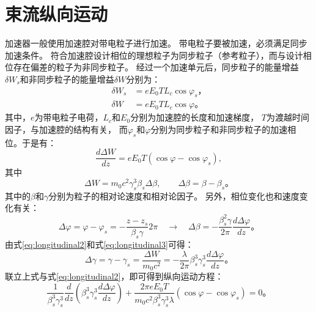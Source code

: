 \section{束流纵向运动}
加速器一般使用加速腔对带电粒子进行加速\cite{wang1986protronLinac,yao1986elecLinac,wangler1998principles}。
带电粒子要被加速，必须满足同步加速条件。
符合加速腔设计相位的理想粒子为同步粒子（参考粒子），而与设计相位存在偏差的粒子为非同步粒子。
经过一个加速单元后，同步粒子的能量增益$\delta W_s$和非同步粒子的能量增益$\delta W$分别为：
\begin{equation}
    \label{eq:longitudinal1}
    \begin{aligned}
        \delta W_s &= e E_0 T L_c \cos {\varphi}_s \text{，} \\
        \delta W   &= e E_0 T L_c \cos {\varphi}   \text{。}
    \end{aligned}
\end{equation}
其中，$e$为带电粒子电荷，$L_c$和$E_0$分别为加速腔的长度和加速梯度，
$T$为渡越时间因子，与加速腔的结构有关，
而${\varphi}_s$和${\varphi}$分别为同步粒子和非同步粒子的加速相位。于是有：
\begin{equation}
    \label{eq:longitudinal2}
        \frac{d\Delta W}{dz} = e E_0 T (\cos {\varphi} - \cos {\varphi}_s),
\end{equation}
其中
\begin{equation}
    \label{eq:longitudinal2_cont}
        \Delta W = m_0 c^2 {\gamma}_s^3 {\beta}_s \Delta \beta, \qquad \Delta \beta = \beta - {\beta}_s \text{。}
\end{equation}
其中的$\beta$和$\gamma$分别为粒子的相对论速度和相对论因子。
另外，相位变化也和速度变化有关：
\begin{equation}
    \label{eq:longitudinal3}
        \Delta \varphi = \varphi - {\varphi}_s = -\frac{z-z_s}{\beta _s \gamma} 2\pi
        \quad \rightarrow \quad
        \Delta \beta = - \frac{\beta_s^2 \gamma}{2\pi} \frac{d \Delta \varphi}{dz} \text{。}
\end{equation}
由式\eqref{eq:longitudinal2}和式\eqref{eq:longitudinal3}可得：
\begin{equation}
    \label{eq:longitudinal4}
        \Delta \gamma = \gamma - \gamma _s
                = \frac{\Delta W}{m_0 c^2}
                = -\frac{\lambda}{2\pi} \beta_s^3 \gamma_s^3 \frac{d\Delta \varphi}{dz} \text{。}
\end{equation}
联立上式与式\eqref{eq:longitudinal2}，即可得到纵向运动方程：
\begin{equation}
    \label{eq:longitudinal_equation}
        \frac{1}{\beta_s^3 \gamma_s^3} \frac{d}{dz}\left(\beta_s^3 \gamma_s^3 \frac{d\Delta \varphi}{dz}\right)
        +\frac{2\pi e E_0 T}{m_0 c^2 \beta_s^3 \gamma_s^3 \lambda} (\cos {\varphi} - \cos {\varphi}_s)
        =0 \text{。}
\end{equation}
